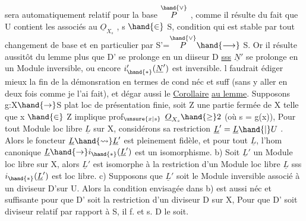 
sera automatiquement  relatif pour la base $\overset{\hand{\vee}}{P}$ , comme il
résulte du fait que U contient les  associés au $\underline{O}_{X_s}$ , s $\hand{\in}$ S,
condition qui est stable par tout changement de base et en particulier
par S'=$\overset{\hand{\vee}}{P} \hand{\longrightarrow}$ S. Or il résulte aussitôt du lemme  plus  que D' se
prolonge en un diiseur  D \uline{sss} $\underline{N}'$ se prolonge en un Module
inversible, ou encore $i'_{\hand{*}}(\underline{N}')$ est inversible.  l faudrait édiger
mieux la fin de la démonsration en termes de cond néc et suff (sans y
aller en deux fois comme je l'ai fait), et dégar aussi  le
\margin{$|$}\uline{Corollaire}  \uline{au lemme}. Supposons g:X$\hand{\to}$S plat loc de présentation finie,
soit Z une partie fermée de X telle que x $\hand{\in}$ Z implique prof$_{\unsure{x|s}}$ $\underline{O}_{X_s} \hand{\geq} 2$
(où s = g(x)), 
 Pour tout Module loc libre  $\underline{L}$ sur X,
considérons sa restriction $\underline{L}' = \underline{L}\hand{|}U$ . Alors  le foncteur $\underline{L} \hand{\rightsquigarrow} \underline{L}'$ est
pleinement fidèle, et pour  tout $\underline{L}$, 
l'hom canonique $\underline{L} \hand{\to} i_{\hand{*}}(\underline{L}')$ est un isomorphisme.  b) Soit $\underline{L}'$ un
Module loc libre sur X, alors $\underline{L}'$ est isomorphe à la restriction d'un
Module loc libre $\underline{L}$ sss $i_{\hand{*}}(\underline{L}')$ est loc libre. c) Supposons que $\underline{L}'$ soit
le Module inversible associé à un diviseur  D'\hand{/}sur U. Alors
la condition envisagée dans b) est aussi néc et suffisante pour que D'
soit la restriction d'un diviseur  D sur X,  Pour que D' soit
diviseur  relatif par rapport à S, il f. et s.  D le soit.

